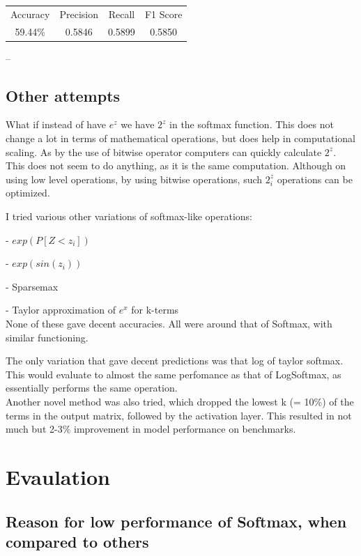 \documentclass{article}
\begin{document}
\begin{center}
\begin{tabular}{ |c|c|c|c| } 
 \hline
 Accuracy & Precision & Recall & F1 Score \\ 
 59.44\% & 0.5846 & 0.5899 & 0.5850 \\
 \hline
\end{tabular}
\end{center}

--



\subsection{Other attempts}

What if instead of have \(e^z\) we have \(2^z\) in the softmax function. This does not change a lot in terms of mathematical operations, but does help in computational scaling. As by the use of bitwise operator computers can quickly calculate \(2^z\). This does not seem to do anything, as it is the same computation. Although on using low level operations, by using bitwise operations, such \(2^z_i\) operations can be optimized.

I tried various other variations of softmax-like operations: 

- \(exp(P[Z<z_i])\)

- \(exp(sin(z_i))\)

- Sparsemax\cite{sparsemax}

- Taylor approximation of \(e^x\) for k-terms
\\
None of these gave decent accuracies. All were around that of Softmax, with similar functioning.

The only variation that gave decent predictions was that log of taylor softmax. This would evaluate to almost the same perfomance as that of LogSoftmax, as essentially performs the same operation.
\\
Another novel method was also tried, which dropped the lowest k (= 10\%) of the terms in the output matrix, followed by the activation layer. This resulted in not much but 2-3\% improvement in model performance on benchmarks.

\section{Evaulation}

\subsection{Reason for low performance of Softmax, when compared to others}
\end{document}
